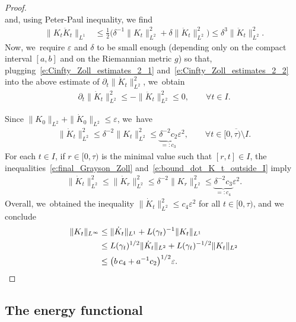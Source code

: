 \documentclass[JEP,XML,SOM,Unicode,NoFloatCountersInSection,published]{cedram}
\let\epsilon\varepsilon
\theoremstyle{plain}
\theoremstyle{definition}
\begin{document}
\begin{proof}
\begin{equation}
\end{equation}
and, using Peter-Paul inequality, we find
\begin{equation}
\label{e:Cinfty_Zoll_estimates_2_2}
\begin{split}
\|K_t \ddot K_t\|_{L^1}
&\leq
\tfrac12\big(\delta^{-1}\|K_t\|_{L^2}^2+ \delta\|\ddot K_t\|_{L^2}^2\big)
\leq
\delta^3 \|\ddot K_t\|_{L^2}^2.
\end{split}
\end{equation}
Now, we~require $\epsilon$ and $\delta$ to be small enough (depending only on the compact interval $[a,b]$ and on the Riemannian metric $g$) so that, plugging~\eqref{e:Cinfty_Zoll_estimates_2_1} and~\eqref{e:Cinfty_Zoll_estimates_2_2} into the above estimate of $\partial_t\|\dot K_t\|_{L^2}^2$, we~obtain
\begin{align}
\label{e:final_Grayson_Zoll}
\partial_t\|\dot K_t\|_{L^2}^2
\leq
-\|\ddot K_t\|_{L^2}^2
\leq
0,
\qquad\forall t\in I.
\end{align}

Since $\|K_0\|_{L^2}+\|\dot K_0\|_{L^2}\leq\epsilon$, we~have
\begin{align}
\label{e:bound_dot_K_t_outside_I}
\|\dot K_t\|_{L^2}^2\leq \delta^{-2}\|K_t\|_{L^2}^2\leq \underbrace{\delta^{-2}c_2}_{=:c_3}\epsilon^2,
\qquad\forall t\in\overline{[0,\tau)\setminus I}.
\end{align}
For each $t\in I$, if $r\in[0,\tau)$ is the minimal value such that $[r,t]\in I$, the inequalities~\eqref{e:final_Grayson_Zoll} and~\eqref{e:bound_dot_K_t_outside_I} imply
\begin{align*}
\|\dot K_t\|_{L^2}^2
\leq
\|\dot K_r\|_{L^2}^2
\leq
\delta^{-2}\|K_{r}\|_{L^2}^2
\leq
\underbrace{\delta^{-2} c_3}_{=:c_4} \epsilon^2.
\end{align*}
Overall, we~obtained the inequality $\|\dot K_t\|_{L^2}^2\leq c_4\epsilon^2$ for all $t\in[0,\tau)$, and we conclude
\begin{align*}
\|K_t\|_{L^\infty}
&\leq
\|\dot K_t\|_{L^1} + L(\gamma_t)^{-1}\|K_t\|_{L^1}\\
&\leq
L(\gamma_t)^{1/2}\|\dot K_t\|_{L^2} + L(\gamma_t)^{-1/2}\|K_t\|_{L^2}\\
&\leq\big(b\,c_4 + a^{-1}c_2\big)^{1/2}\epsilon.
\qedhere
\end{align*}
\end{proof}

\subsection{The energy functional}\label{ss:energy}
\end{document}
